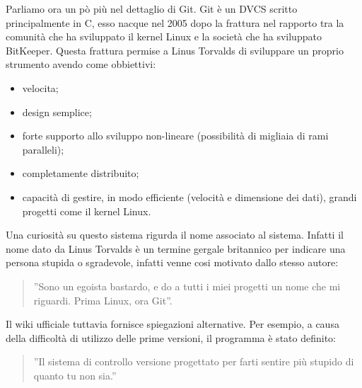 Parliamo ora un pò più nel dettaglio di Git. Git è un DVCS scritto principalmente in C, esso nacque nel 2005 dopo la frattura nel rapporto tra la comunità che ha sviluppato il kernel Linux e la società che ha sviluppato BitKeeper. Questa frattura permise a Linus Torvalds di sviluppare un proprio strumento avendo come obbiettivi:

\begin{itemize}
\item velocita;
\item design semplice;
\item forte supporto allo sviluppo non-lineare (possibilità di migliaia di rami paralleli);
\item completamente distribuito;
\item capacità di gestire, in modo efficiente (velocità e dimensione dei dati), grandi progetti come il kernel Linux.
\end{itemize}

Una curiosità su questo sistema rigurda il nome associato al sistema. Infatti il nome dato da Linus Torvalds è un termine gergale britannico per indicare una persona stupida o sgradevole, infatti venne cosi motivato dallo stesso autore:

\begin{quotation}
''Sono un egoista bastardo, e do a tutti i miei progetti un nome che mi riguardi. Prima Linux, ora Git''.
\end{quotation}

Il wiki ufficiale tuttavia fornisce spiegazioni alternative. Per esempio, a causa della difficoltà di utilizzo delle prime versioni, il programma è stato definito:

\begin{quotation}
''Il sistema di controllo versione progettato per farti sentire più stupido di quanto tu non sia.''
\end{quotation}